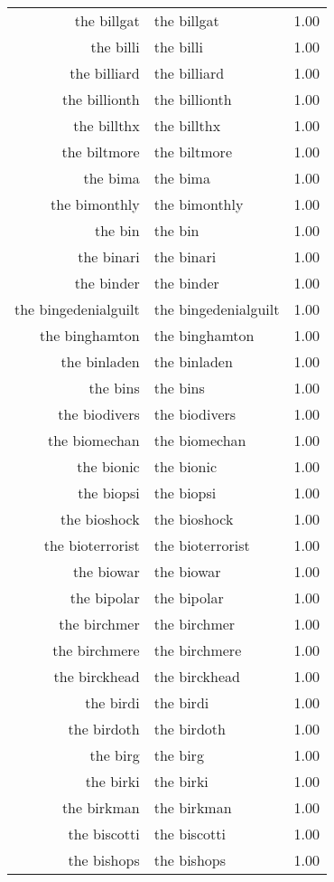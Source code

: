 \begin{table}[ht]
\begin{tabular}{rlr}
  the billgat & the billgat & 1.00 \\ 
  the billi & the billi & 1.00 \\ 
  the billiard & the billiard & 1.00 \\ 
  the billionth & the billionth & 1.00 \\ 
  the billthx & the billthx & 1.00 \\ 
  the biltmore & the biltmore & 1.00 \\ 
  the bima & the bima & 1.00 \\ 
  the bimonthly & the bimonthly & 1.00 \\ 
  the bin & the bin & 1.00 \\ 
  the binari & the binari & 1.00 \\ 
  the binder & the binder & 1.00 \\ 
  the bingedenialguilt & the bingedenialguilt & 1.00 \\ 
  the binghamton & the binghamton & 1.00 \\ 
  the binladen & the binladen & 1.00 \\ 
  the bins & the bins & 1.00 \\ 
  the biodivers & the biodivers & 1.00 \\ 
  the biomechan & the biomechan & 1.00 \\ 
  the bionic & the bionic & 1.00 \\ 
  the biopsi & the biopsi & 1.00 \\ 
  the bioshock & the bioshock & 1.00 \\ 
  the bioterrorist & the bioterrorist & 1.00 \\ 
  the biowar & the biowar & 1.00 \\ 
  the bipolar & the bipolar & 1.00 \\ 
  the birchmer & the birchmer & 1.00 \\ 
  the birchmere & the birchmere & 1.00 \\ 
  the birckhead & the birckhead & 1.00 \\ 
  the birdi & the birdi & 1.00 \\ 
  the birdoth & the birdoth & 1.00 \\ 
  the birg & the birg & 1.00 \\ 
  the birki & the birki & 1.00 \\ 
  the birkman & the birkman & 1.00 \\ 
  the biscotti & the biscotti & 1.00 \\ 
  the bishops & the bishops & 1.00 \\ 

\end{tabular}
\end{table}

